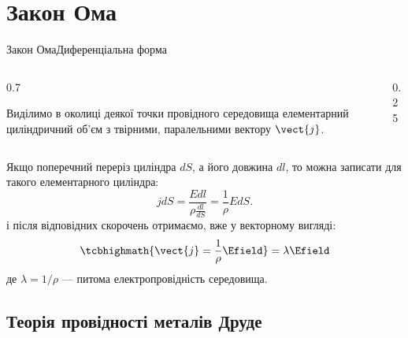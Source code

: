 \documentclass[onlytextwidth]{beamer}
\begin{document}
\section{Закон Ома}


\begin{frame}{Закон Ома}{Диференціальна форма}
	\begin{columns}
		\begin{column}{0.7\linewidth}
			\begin{block}{}\justifying
				Виділимо в околиці деякої точки провідного середовища елементарний циліндричний об'єм з
				твірними, паралельними вектору $\vect{j}$.
			\end{block}
		\end{column}
		\hfill
		\begin{column}{0.25\linewidth}\centering
			
		\end{column}
	\end{columns}
	\begin{block}{}\justifying
		Якщо поперечний переріз циліндра $dS$, а його довжина $dl$, то можна записати для такого
		елементарного циліндра:
		\begin{equation*}
			jdS = \frac{Edl}{\rho \frac{dl}{dS}} = \frac1\rho EdS.
		\end{equation*}
		і після відповідних скорочень отримаємо, вже у векторному вигляді:
		\begin{equation*}
			\tcbhighmath{\vect{j} = \frac1\rho \Efield} = \lambda \Efield
		\end{equation*}
		де $\lambda = 1/\rho$ --- питома електропровідність середовища.
	\end{block}
\end{frame}


\subsection{Теорія провідності металів Друде}
\end{document}
